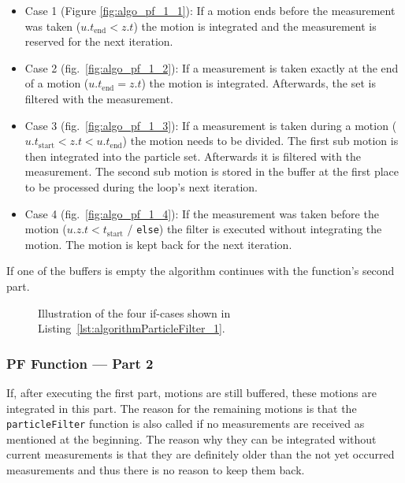 \begin{itemize}
\item{Case 1} (Figure \ref{fig:algo_pf_1_1}): If a motion ends before the measurement was taken ($u.{t_\text{end}} < z.t$) the motion is integrated and the measurement is reserved for the next iteration.

\item{Case 2} (fig.\ \ref{fig:algo_pf_1_2}): If a measurement is taken exactly at the end of a motion ($u.{t_\text{end}} = z.t$) the motion is integrated. Afterwards, the set is filtered with the measurement.

\item{Case 3} (fig.\ \ref{fig:algo_pf_1_3}): If a measurement is taken during a motion ($u.{t_\text{start}} < z.t < u.{t_\text{end}}$) the motion needs to be divided. The first sub motion is then integrated into the particle set. Afterwards it is filtered with the measurement. The second sub motion is stored in the buffer at the first place to be processed during the loop's next iteration.

\item{Case 4} (fig.\ \ref{fig:algo_pf_1_4}): If the measurement was taken before the motion ($u.{z.t < t_\text{start}}$ / \texttt{else}) the filter is executed without integrating the motion. The motion is kept back for the next iteration.

\end{itemize}

\noindent If one of the buffers is empty the algorithm continues with the function's second part.



\begin{figure}
	
	\caption{Illustration of the four if-cases shown in Listing~\ref{lst:algorithmParticleFilter_1}.}
	\label{fig:algo_pf_1}
\end{figure}


\subsubsection*{\acl{PF} Function --- Part 2}
If, after executing the first part, motions are still buffered, these motions are integrated in this part. The reason for the remaining motions is that the \texttt{particleFilter} function is also called if no measurements are received as mentioned at the beginning. The reason why they can be integrated without current measurements is that they are definitely older than the not yet occurred measurements and thus there is no reason to keep them back.

